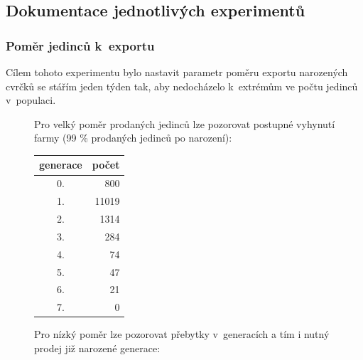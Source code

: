 \documentclass[11pt, a4paper, titlepage]{article}
\begin{document}
    \subsection{Dokumentace jednotlivých experimentů}

    \subsubsection{Poměr jedinců k~exportu}
    Cílem tohoto experimentu bylo nastavit parametr poměru exportu narozených cvrčků se stářím jeden týden tak, aby
    nedocházelo k~extrémům ve počtu jedinců v~populaci.
    \begin{figure}[H]
        \centering
        \begin{minipage}{.48\textwidth}
            Pro velký poměr prodaných jedinců lze pozorovat postupné vyhynutí farmy (99 \% prodaných jedinců po narození):
            \hspace{10pt}
            \begin{center}
                \begin{table}[H]
                    \begin{tabular}{|c|r|}
                        \hline
                        generace & počet \\
                        \hline
                        0. & 800  \\
                        1. & 11019  \\
                        2. & 1314  \\
                        3. & 284  \\
                        4. & 74  \\
                        5. & 47  \\
                        6. & 21  \\
                        7. & 0  \\
                        \hline
                    \end{tabular}
                \end{table}
            \end{center}
        \end{minipage}%
        \begin{minipage}{.5\textwidth}
            Pro nízký poměr lze pozorovat přebytky v~generacích a tím i nutný prodej již narozené generace:
            \begin{center}
                \begin{table}[H]
                    \begin{tabular}{|r|r|r|}

\end{tabular}
\end{table}
\end{center}
\end{minipage}
\end{figure}
\end{document}
